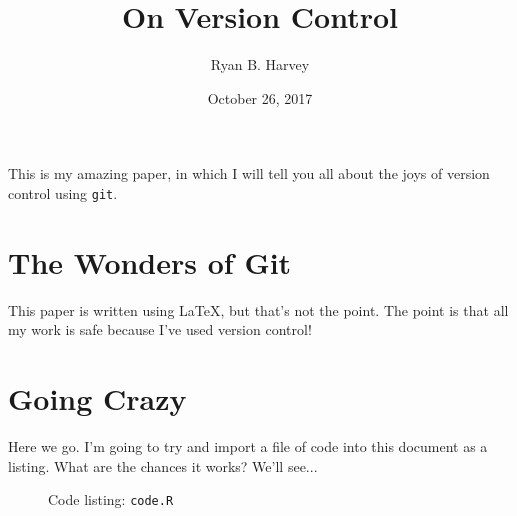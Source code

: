 \documentclass{article}      %
\title{On Version Control}   %
\author{Ryan B. Harvey}      %
\date{October 26, 2017}      %
\def\code#1{\texttt{#1}}
\begin{document}

\maketitle                   %

This is my amazing paper, in which I will tell you all about the joys
of version control using \code{git}.

\section{The Wonders of Git} %

This paper is written using
\LaTeX,    %
but that's not the point. The point is that all my
work is safe because I've used version control!

\section{Going Crazy}
Here we go. I'm going to try and import a file of code
into this document as a listing. What are the chances it
works? We'll see...

\begin{figure}
  \caption{Code listing: \code{code.R}}
  
\end{figure}
\end{document}
